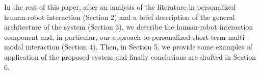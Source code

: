 In the rest of this paper, after an analysis of the literature in personalized human-robot interaction (Section 2) and a brief description of the general architecture of the \coaches system (Section 3), we describe the human-robot interaction component and, in particular, our approach to personalized short-term multi-modal interaction (Section 4). Then, in Section 5, we provide some examples of application of the proposed system and finally conclusions are drafted in Section 6.

